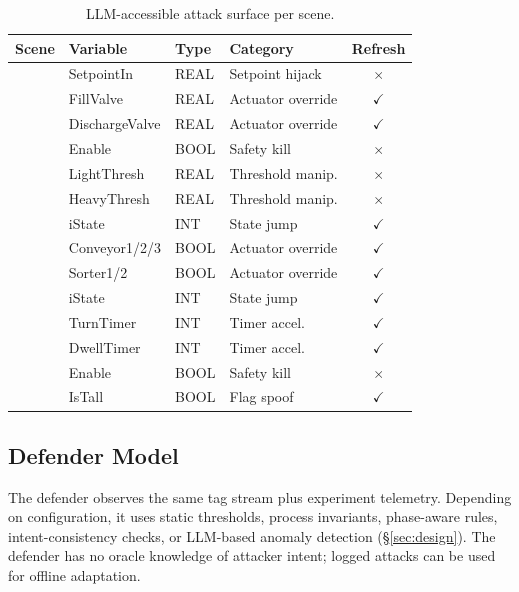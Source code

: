 \begin{table}[t]
\centering
\caption{LLM-accessible attack surface per scene.}
\label{tab:attack_surface}
\small
\begin{tabular}{@{}llllc@{}}
\toprule
\textbf{Scene} & \textbf{Variable} & \textbf{Type} & \textbf{Category} & \textbf{Refresh} \\
\midrule
{} & SetpointIn & REAL & Setpoint hijack & $\times$ \\
& FillValve & REAL & Actuator override & $\checkmark$ \\
& DischargeValve & REAL & Actuator override & $\checkmark$ \\
& Enable & BOOL & Safety kill & $\times$ \\
\midrule
{} & LightThresh & REAL & Threshold manip. & $\times$ \\
& HeavyThresh & REAL & Threshold manip. & $\times$ \\
& iState & INT & State jump & $\checkmark$ \\
& Conveyor1/2/3 & BOOL & Actuator override & $\checkmark$ \\
& Sorter1/2 & BOOL & Actuator override & $\checkmark$ \\
\midrule
{} & iState & INT & State jump & $\checkmark$ \\
& TurnTimer & INT & Timer accel. & $\checkmark$ \\
& DwellTimer & INT & Timer accel. & $\checkmark$ \\
& Enable & BOOL & Safety kill & $\times$ \\
& IsTall & BOOL & Flag spoof & $\checkmark$ \\
\bottomrule
\end{tabular}
\end{table}

\subsection{Defender Model}

The defender observes the same tag stream plus experiment telemetry. Depending on configuration, it uses static thresholds, process invariants, phase-aware rules, intent-consistency checks, or LLM-based anomaly detection (\S\ref{sec:design}). The defender has no oracle knowledge of attacker intent; logged attacks can be used for offline adaptation.

